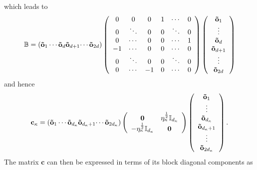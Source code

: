 \documentclass[preprint,aps,showkeys]{revtex4}%
\begin{document}
which leads to
\begin{equation}
\mathbb{B}=\left(  \mathbf{\tilde{o}}_{1}\cdots\mathbf{\tilde{o}}%
_{d}\mathbf{\tilde{o}}_{d+1}\mathbf{\cdots\tilde{o}}_{2d}\right)  \left(
\begin{array}
[c]{cccccc}%
0 & 0 & 0 & 1 & \cdots & 0\\
0 & \ddots & 0 & 0 & \ddots & 0\\
0 & \cdots & 0 & 0 & \cdots & 1\\
-1 & \cdots & 0 & 0 & \cdots & 0\\
0 & \ddots & 0 & 0 & \ddots & 0\\
0 & \cdots & -1 & 0 & \cdots & 0
\end{array}
\right)  \left(
\begin{array}
[c]{c}%
\mathbf{\tilde{o}}_{1}\\
\vdots\\
\mathbf{\tilde{o}}_{d}\\
\mathbf{\tilde{o}}_{d+1}\\
\vdots\\
\mathbf{\tilde{o}}_{2d}%
\end{array}
\right)
\end{equation}
and hence%
\begin{equation}
\mathbf{c}_{\kappa}=\left(  \mathbf{\tilde{o}}_{1}\cdots\mathbf{\tilde{o}%
}_{d_{\kappa}}\mathbf{\tilde{o}}_{d_{\kappa}+1}\mathbf{\cdots\tilde{o}%
}_{2d_{\kappa}}\right)  \left(
\begin{array}
[c]{cc}%
\mathbf{0} & \eta_{\kappa}^{\frac{1}{2}}\mathbb{I}_{d_{\kappa}}\\
-\eta_{\kappa}^{\frac{1}{2}}\mathbb{I}_{d_{\kappa}} & \mathbf{0}%
\end{array}
\right)  \left(
\begin{array}
[c]{c}%
\mathbf{\tilde{o}}_{1}\\
\vdots\\
\mathbf{\tilde{o}}_{d_{\kappa}}\\
\mathbf{\tilde{o}}_{d_{\kappa}+1}\\
\vdots\\
\mathbf{\tilde{o}}_{2d_{\kappa}}%
\end{array}
\right)  .
\end{equation}
The matrix $\mathbf{c}$ can then be expressed in terms of its block diagonal
components as
\end{document}
